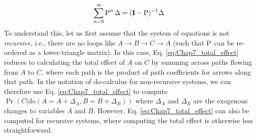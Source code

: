 \begin{equation} \label{eq:Chap7_total_effect}
    \sum_{n=0}^{\infty} \Rho^n \Delta = (\mathbf{I-\Rho})^{-1} \Delta
\end{equation}
To understand this, let us first assume that the system of equations is not \textit{recursive}, i.e., there are no loops like \(A \rightarrow B \rightarrow C \rightarrow A\) (such that \(\operatorname{P}\) can be re-ordered as a lower-triangle matrix).  In this case, Eq. \ref{eq:Chap7_total_effect} reduces to calculating the total effect of \(A\) on \(C\) by summing across paths flowing from \(A\) to \(C\), where each path is the product of path coefficients for arrows along that path. In the notation of do-calculus for non-recursive systems, we can therefore use Eq. \ref{eq:Chap7_total_effect} to compute \(\Pr(C | \mathrm{do}(A=A+\Delta_A, B=B+\Delta_B))\) where \(\Delta_A\) and \(\Delta_B\) are the exogenous changes to variables \(A\) and \(B\).  However, Eq. \ref{eq:Chap7_total_effect} can also be computed for recursive systems, where computing the total effect is otherwise less straightforward.  

\lstset{style=Rcode} 


